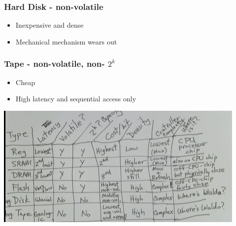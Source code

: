 \documentclass{article}
\begin{document}
\subsubsection{Hard Disk - non-volatile}

\begin{itemize}
    \item Inexpensive and dense
    
    \item Mechanical mechanism wears out 
\end{itemize}

\subsubsection{Tape - non-volatile, non- $2^k$}

\begin{itemize}
    \item Cheap
    \item High latency and sequential access only
\end{itemize}

\includegraphics[]{images/table.png}
\end{document}

